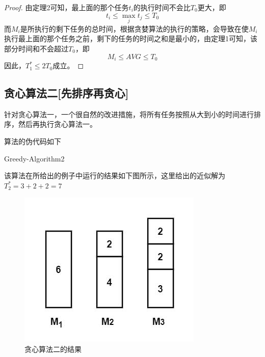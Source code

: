 \begin{proof}
	由定理2可知，最上面的那个任务$t_i$的执行时间不会比$T_0$更大，即
	\begin{equation*}
		t_i \leq \max_j t_j \leq T_0
	\end{equation*}
	而$M_i$是所执行的剩下任务的总时间，根据贪婪算法的执行的策略，会导致在使$M_i$执行最上面的那个任务之前，剩下的任务的时间之和是最小的，由定理1可知，该部分时间和不会超过$T_0$，即
	\begin{equation*}
		M_i \leq AVG \leq T_0
	\end{equation*}
	因此，$T_1^*\leq 2T_0$成立。
\end{proof}

\subsection{贪心算法二[先排序再贪心]}
针对贪心算法一，一个很自然的改进措施，将所有任务按照从大到小的时间进行排序，然后再执行贪心算法一。

算法的伪代码如下

\begin{algorithm}
	\DontPrintSemicolon{}
	\caption{Greedy-Algorithm2}\label{greedy2-algo}
\end{algorithm}

该算法在所给出的例子中运行的结果如下图所示，这里给出的近似解为$T_2^*=3+2+2=7$
\begin{figure}[hbt]
	\centering
	\includegraphics{image/greedy2-result.jpg}
	\caption{贪心算法二的结果}\label{fig:greedy2-result}
\end{figure}

